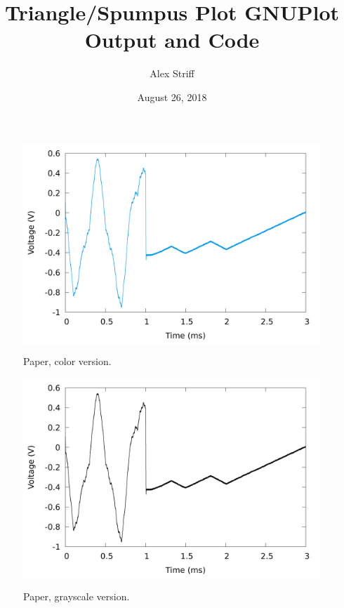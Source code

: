 \documentclass[11pt,letterpaper]{article}
\title{Triangle/Spumpus Plot GNUPlot Output and Code}
\author{Alex Striff}
\date{August 26, 2018}
\begin{document}
\maketitle

\begin{figure}[H]
  \centering
  \colorbox{white}{%
    \includegraphics[width=\linewidth]{../spumpus-pc.png}
  }
  \caption{Paper, color version.}
\end{figure}
\begin{figure}[H]
  \centering
  \colorbox{white}{%
    \includegraphics[width=\linewidth]{../spumpus-pg.png}
  }
  \caption{Paper, grayscale version.}
\end{figure}
\end{document}
